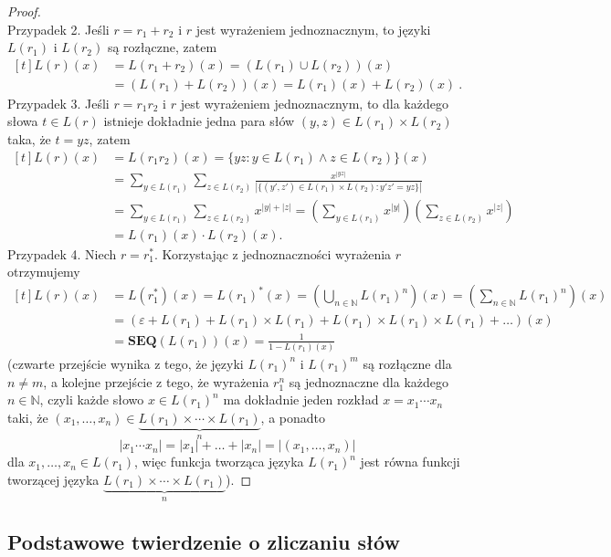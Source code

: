 \begin{proof}
\noindent\\%
Przypadek 2. Jeśli $r=r_1+r_2$ i $r$ jest wyrażeniem jednoznacznym, to języki $L(r_1)$ i $L(r_2)$ są rozłączne, zatem
        $$\begin{aligned}[t]
            L(r)(x)&=L(r_1+r_2)(x)=(L(r_1)\cup L(r_2))(x)\\
            &=(L(r_1)+L(r_2))(x)=L(r_1)(x)+L(r_2)(x)~.
        \end{aligned}$$
Przypadek 3. Jeśli $r=r_1 r_2$ i $r$ jest wyrażeniem jednoznacznym, to dla każdego słowa $t\in L(r)$ istnieje dokładnie jedna para słów $(y,z)\in L(r_1)\times L(r_2)$ taka, że $t=yz$, zatem
        $$\begin{aligned}[t]
            L(r)(x)&=L(r_1 r_2)(x)=\{yz:y\in L(r_1)\wedge z\in L(r_2)\}(x)\\
            &=\sum_{y\in L(r_1)}{\sum_{z\in L(r_2)}{\frac{x^{|yz|}}{|\{(y',z')\in L(r_1)\times L(r_2):y'z'=yz\}|}}}\\
            &=\sum_{y\in L(r_1)}{\sum_{z\in L(r_2)}{x^{|y|+|z|}}}=\left(\sum_{y\in L(r_1)}{x^{|y|}}\right)\left(\sum_{z\in L(r_2)}{x^{|z|}}\right)\\
            &=L(r_1)(x)\cdot L(r_2)(x).
        \end{aligned}$$
Przypadek 4. Niech $r=r_1^*$. Korzystając z jednoznaczności wyrażenia $r$ otrzymujemy
        $$\begin{aligned}[t]
            L(r)(x)&=L(r_1^*)(x)=L(r_1)^*(x)=\left(\bigcup_{n\in\mathbb{N}}{L(r_1)^n}\right)(x)=\left(\sum_{n\in\mathbb{N}}{L(r_1)^n}\right)(x)\\
            &=(\varepsilon+L(r_1)+L(r_1)\times L(r_1)+L(r_1)\times L(r_1) \times L(r_1)+\ldots)(x)\\
            &=\mathbf{SEQ}(L(r_1))(x)=\frac{1}{1-L(r_1)(x)}
        \end{aligned}$$
        (czwarte przejście wynika z tego, że języki $L(r_1)^n$ i $L(r_1)^m$ są rozłączne dla $n\neq m$, a kolejne przejście z tego, że wyrażenia $r_1^n$ są jednoznaczne dla każdego $n\in\mathbb{N}$, czyli każde słowo $x\in L(r_1)^n$ ma dokładnie jeden rozkład $x=x_1\dotsm x_n$ taki, że $(x_1,\dotsc,x_n)\in \underbrace{L(r_1)\times\dotsm\times L(r_1)}_n$, a ponadto
        $$|x_1 \dotsm x_n|=|x_1|+\ldots+|x_n|=|(x_1,\dotsc,x_n)|$$
        dla $x_1,\dotsc,x_n\in L(r_1)$, więc funkcja tworząca języka $L(r_1)^n$ jest równa funkcji tworzącej języka $\underbrace{L(r_1)\times\dotsm\times L(r_1)}_n$).
\end{proof}

\subsection{Podstawowe twierdzenie o zliczaniu słów}

